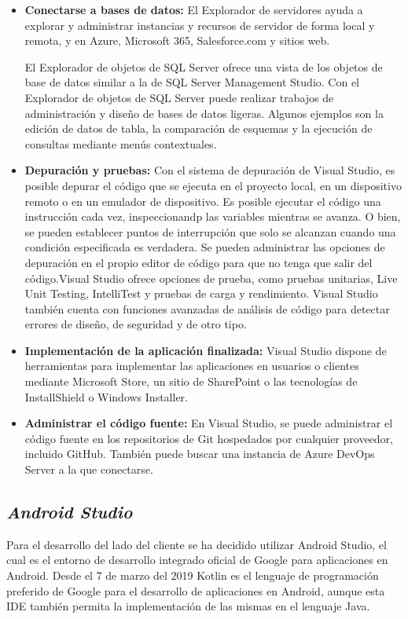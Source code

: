 \begin{itemize}
\begin{itemize}
    \end{itemize}
    \item \textbf{Conectarse a bases de datos: } El Explorador de servidores
    ayuda a explorar y administrar instancias y recursos de servidor de forma
    local y remota, y en Azure, Microsoft 365, Salesforce.com y sitios web.
    
    El Explorador de objetos de SQL Server ofrece una vista de los objetos de
    base de datos similar a la de SQL Server Management Studio. Con el
    Explorador de objetos de SQL Server puede realizar trabajos de
    administración y diseño de bases de datos ligeras. Algunos ejemplos son la
    edición de datos de tabla, la comparación de esquemas y la ejecución de
    consultas mediante menús contextuales.
    \item \textbf{Depuración y pruebas: }Con el sistema de depuración de Visual
    Studio, es posible depurar el código que se ejecuta en el proyecto local, en
    un dispositivo remoto o en un emulador de dispositivo. Es posible ejecutar
    el código una instrucción cada vez, inspeccionandp las variables mientras se
    avanza. O bien, se pueden establecer puntos de interrupción que solo se
    alcanzan cuando una condición especificada es verdadera. Se pueden
    administrar las opciones de depuración en el propio editor de código para
    que no tenga que salir del código.Visual Studio ofrece opciones de prueba,
    como pruebas unitarias, Live Unit Testing, IntelliTest y pruebas de carga y
    rendimiento. Visual Studio también cuenta con funciones avanzadas de
    análisis de código para detectar errores de diseño, de seguridad y de otro
    tipo.
    \item \textbf{Implementación de la aplicación finalizada: }Visual Studio
    dispone de herramientas para implementar las aplicaciones en usuarios o
    clientes mediante Microsoft Store, un sitio de SharePoint o las tecnologías
    de InstallShield o Windows Installer.
    \item \textbf{Administrar el código fuente: }En Visual Studio, se puede
    administrar el código fuente en los repositorios de Git hospedados por
    cualquier proveedor, incluido GitHub. También puede buscar una instancia de
    Azure DevOps Server a la que conectarse.
\end{itemize}

\subsection{\textit{Android Studio}} 
Para el desarrollo del lado del cliente se ha decidido utilizar Android
Studio, el cual es el entorno de desarrollo integrado oficial de Google para
aplicaciones en Android. Desde el 7 de marzo del 2019 Kotlin es el lenguaje de
programación preferido de Google para el desarrollo de aplicaciones en Android,
aunque esta IDE también permita la implementación de las mismas en el lenguaje
Java. \cite{androidStudio}


